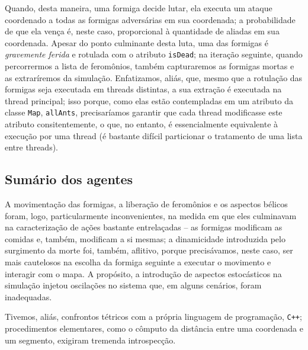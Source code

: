 \documentclass[12pt]{article}
\theoremstyle{definition}
\begin{document}
Quando, desta maneira, uma formiga decide lutar, ela executa um ataque coordenado a todas as formigas adversárias em sua coordenada; a probabilidade de que ela vença é, neste caso, proporcional à quantidade de aliadas em sua coordenada. Apesar do ponto culminante desta luta, uma das formigas é \textit{gravemente ferida} e rotulada com o atributo \texttt{isDead}; na iteração seguinte, quando percorrermos a lista de feromônios, também capturaremos as formigas mortas e as extraríremos da simulação. Enfatizamos, aliás, que, mesmo que a rotulação das formigas seja executada em threads distintas, a sua extração é executada na thread principal; isso porque, como elas estão contempladas em um atributo da classe \texttt{Map}, \texttt{allAnts}, precisaríamos garantir que cada thread modificasse este atributo consitentemente, o que, no entanto, é essencialmente equivalente à execução por uma thread (é bastante difícil particionar o tratamento de uma lista entre threads). 

\subsection{Sumário dos agentes} 

A movimentação das formigas, a liberação de feromônios e os aspectos bélicos foram, logo, particularmente inconvenientes, na medida em que eles culminavam na caracterização de ações bastante entrelaçadas -- as formigas modificam as comidas e, também, modificam a si mesmas; a dinamicidade introduzida pelo surgimento da morte foi, também, aflitivo, porque precisávamos, neste caso, ser mais cautelosos na escolha da formiga seguinte a executar o movimento e interagir com o mapa. A propósito, a introdução de aspectos estocásticos na simulação injetou oscilações no sistema que, em alguns cenários, foram inadequadas. 

Tivemos, aliás, confrontos tétricos com a própria linguagem de programação, \texttt{C++}; procedimentos elementares, como o cômputo da distância entre uma coordenada e um segmento, exigiram tremenda introspecção. 
\end{document}
